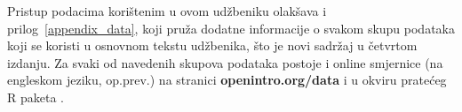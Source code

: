 Pristup podacima korištenim u ovom udžbeniku olakšava i
prilog~\ref{appendix_data},
koji pruža dodatne informacije o svakom skupu podataka
koji se koristi u osnovnom tekstu udžbenika, što je novi sadržaj u četvrtom izdanju.
Za svaki od navedenih skupova podataka postoje i online smjernice (na engleskom jeziku, op.prev.) na stranici
{\color{black}\textbf{openintro.org/data}}
i u okviru pratećeg R paketa
.%




\vspace{3mm}

%
%



